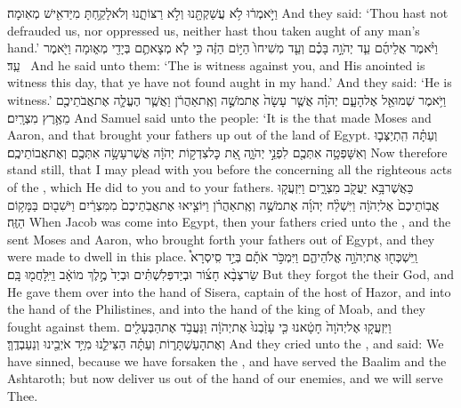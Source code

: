 {וַיֹּ֣אמְר֔וּ לֹ֥א עֲשַׁקְתָּ֖נוּ וְלֹ֣א רַצּוֹתָ֑נוּ וְלֹא\maqqaf לָקַ֥חְתָּ מִיַּד\maqqaf אִ֖ישׁ מְאֽוּמָה׃}
{And they said: ‘Thou hast not defrauded us, nor oppressed us, neither hast thou taken aught of any man’s hand.’}
{וַיֹּ֨אמֶר אֲלֵיהֶ֜ם עֵ֧ד יְהֹוָ֣ה בָּכֶ֗ם וְעֵ֤ד מְשִׁיחוֹ֙ הַיּ֣וֹם הַזֶּ֔ה כִּ֣י לֹ֧א מְצָאתֶ֛ם בְּיָדִ֖י מְא֑וּמָה וַיֹּ֖אמֶר עֵֽד׃ \petucha }
{And he said unto them: ‘The \lord\space is witness against you, and His anointed is witness this day, that ye have not found aught in my hand.’ And they said: ‘He is witness.’}
{וַיֹּ֥אמֶר שְׁמוּאֵ֖ל אֶל\maqqaf הָעָ֑ם יְהֹוָ֗ה אֲשֶׁ֤ר עָשָׂה֙ אֶת\maqqaf מֹשֶׁ֣ה וְאֶֽת\maqqaf אַהֲרֹ֔ן וַאֲשֶׁ֧ר הֶעֱלָ֛ה אֶת\maqqaf אֲבֹתֵיכֶ֖ם מֵאֶ֥רֶץ מִצְרָֽיִם׃}
{And Samuel said unto the people: ‘It is the \lord\space that made Moses and Aaron, and that brought your fathers up out of the land of Egypt.}
{וְעַתָּ֗ה הִֽתְיַצְּב֛וּ וְאִשָּׁפְטָ֥ה אִתְּכֶ֖ם לִפְנֵ֣י יְהֹוָ֑ה אֵ֚ת כׇּל\maqqaf צִדְק֣וֹת יְהֹוָ֔ה אֲשֶׁר\maqqaf עָשָׂ֥ה אִתְּכֶ֖ם וְאֶת\maqqaf אֲבוֹתֵיכֶֽם׃}
{Now therefore stand still, that I may plead with you before the \lord\space concerning all the righteous acts of the \lord, which He did to you and to your fathers.}
{כַּאֲשֶׁר\maqqaf בָּ֥א יַעֲקֹ֖ב מִצְרָ֑יִם וַיִּזְעֲק֤וּ אֲבֽוֹתֵיכֶם֙ אֶל\maqqaf יְהֹוָ֔ה וַיִּשְׁלַ֨ח יְהֹוָ֜ה אֶת\maqqaf מֹשֶׁ֣ה וְאֶֽת\maqqaf אַהֲרֹ֗ן וַיּוֹצִ֤יאוּ אֶת\maqqaf אֲבֹֽתֵיכֶם֙ מִמִּצְרַ֔יִם וַיֹּשִׁב֖וּם בַּמָּק֥וֹם הַזֶּֽה׃}
{When Jacob was come into Egypt, then your fathers cried unto the \lord, and the \lord\space sent Moses and Aaron, who brought forth your fathers out of Egypt, and they were made to dwell in this place.}
{וַֽיִּשְׁכְּח֖וּ אֶת\maqqaf יְהֹוָ֣ה אֱלֹהֵיהֶ֑ם וַיִּמְכֹּ֣ר אֹתָ֡ם בְּיַ֣ד סִֽיסְרָא֩ שַׂר\maqqaf צְבָ֨א חָצ֜וֹר וּבְיַד\maqqaf פְּלִשְׁתִּ֗ים וּבְיַד֙ מֶ֣לֶךְ מוֹאָ֔ב וַיִּֽלָּחֲמ֖וּ בָּֽם׃}
{But they forgot the \lord\space their God, and He gave them over into the hand of Sisera, captain of the host of Hazor, and into the hand of the Philistines, and into the hand of the king of Moab, and they fought against them.}
{וַיִּזְעֲק֤וּ אֶל\maqqaf יְהֹוָה֙  חָטָ֔אנוּ כִּ֤י עָזַ֙בְנוּ֙ אֶת\maqqaf יְהֹוָ֔ה וַנַּעֲבֹ֥ד אֶת\maqqaf הַבְּעָלִ֖ים וְאֶת\maqqaf הָעַשְׁתָּר֑וֹת וְעַתָּ֗ה הַצִּילֵ֛נוּ מִיַּ֥ד אֹיְבֵ֖ינוּ וְנַעַבְדֶֽךָּ׃}
{And they cried unto the \lord, and said: We have sinned, because we have forsaken the \lord, and have served the Baalim and the Ashtaroth; but now deliver us out of the hand of our enemies, and we will serve Thee.}
